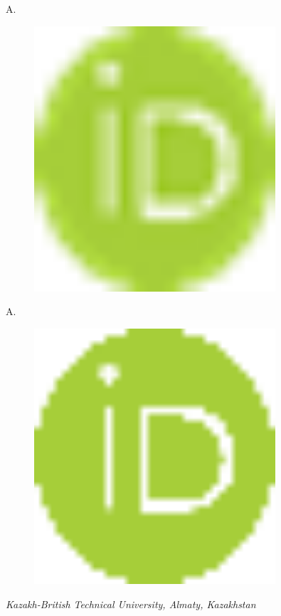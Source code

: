 {A.
\begin{figure}[H]
	\centering
	\includegraphics[width=0.8\textwidth]{media/ict2/image8}
	\caption*{}
\end{figure}

A.
\begin{figure}[H]
	\centering
	\includegraphics[width=0.8\textwidth]{media/ict2/image1}
	\caption*{}
\end{figure}


\emph{Kazakh-British Technical University, Almaty, Kazakhstan}

}
